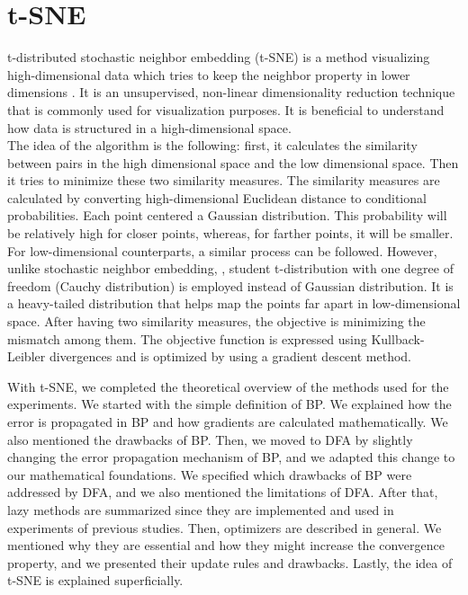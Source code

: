 \documentclass[a4paper, nobind]{templates/ociamthesis}
\begin{document}
\hypertarget{t-sne}{%
\section{t-SNE}\label{t-sne}}

t-distributed stochastic neighbor embedding (t-SNE) is a method visualizing high-dimensional data which tries to keep the neighbor property in lower dimensions \cite{vanDerMaaten2008}. It is an unsupervised, non-linear dimensionality reduction technique that is commonly used for visualization purposes. It is beneficial to understand how data is structured in a high-dimensional space.\\
The idea of the algorithm is the following: first, it calculates the similarity between pairs in the high dimensional space and the low dimensional space. Then it tries to minimize these two similarity measures. The similarity measures are calculated by converting high-dimensional Euclidean distance to conditional probabilities. Each point centered a Gaussian distribution. This probability will be relatively high for closer points, whereas, for farther points, it will be smaller. For low-dimensional counterparts, a similar process can be followed. However, unlike stochastic neighbor embedding, \cite{Hinton_Roweis_2003}, student t-distribution with one degree of freedom (Cauchy distribution) is employed instead of Gaussian distribution. It is a heavy-tailed distribution that helps map the points far apart in low-dimensional space. After having two similarity measures, the objective is minimizing the mismatch among them. The objective function is expressed using Kullback-Leibler divergences and is optimized by using a gradient descent method.

\noindent With t-SNE, we completed the theoretical overview of the methods used for the experiments. We started with the simple definition of BP. We explained how the error is propagated in BP and how gradients are calculated mathematically. We also mentioned the drawbacks of BP. Then, we moved to DFA by slightly changing the error propagation mechanism of BP, and we adapted this change to our mathematical foundations. We specified which drawbacks of BP were addressed by DFA, and we also mentioned the limitations of DFA. After that, lazy methods are summarized since they are implemented and used in experiments of previous studies. Then, optimizers are described in general. We mentioned why they are essential and how they might increase the convergence property, and we presented their update rules and drawbacks. Lastly, the idea of t-SNE is explained superficially.
\end{document}
